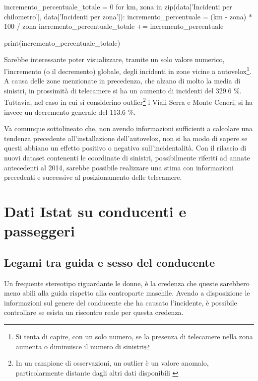 \documentclass[a4paper]{report}
\begin{document}
\begin{code}
incremento_percentuale_totale = 0
for km, zona in zip(data['Incidenti per chilometro'], data['Incidenti per zona']): 
    incremento_percentuale = (km - zona) * 100 / zona
    incremento_percentuale_totale += incremento_percentuale

print(incremento_percentuale_totale)
\end{code}

Sarebbe interessante poter visualizzare, tramite un solo valore numerico, 
l'incremento (o il decremento) globale, degli incidenti in zone vicine a 
autovelox\footnote{Si tenta di capire, con un solo numero, se la presenza di 
telecamere nella zona aumenta o diminuisce il numero di sinistri}. 
A causa delle zone menzionate in precedenza, che alzano di molto la media di sinistri, 
in prossimità di telecamere si ha un aumento di 
incidenti del $329.6$ \%. 
Tuttavia, nel caso in cui si considerino 
outlier\footnote{In un campione di osservazioni, un outlier è un valore anomalo, 
particolarmente distante dagli altri dati disponibili \cite{PROB_E_STATISTICA:1}} 
i Viali Serra e Monte Ceneri, si ha invece un decremento generale del $113.6$ \%. 

Va comunque sottolineato che, non avendo informazioni sufficienti a calcolare una tendenza 
precedente all'installazione dell'autovelox, non si ha modo di sapere se questi abbiano un 
effetto positivo o negativo sull'incidentalità. 
Con il rilascio di nuovi dataset contenenti le coordinate di sinistri, 
possibilmente riferiti ad annate antecedenti al 2014, sarebbe possibile realizzare 
una stima con informazioni precedenti e 
successive al posizionamento delle telecamere. 

\section{Dati Istat su conducenti e passeggeri}

\subsection{Legami tra guida e sesso del conducente}

Un frequente stereotipo riguardante le donne, è la credenza che queste  
sarebbero meno abili alla guida rispetto alla controparte maschile. 
Avendo a disposizione le informazioni sul genere del conducente che ha causato l'incidente, 
è possibile controllare se esista un riscontro reale per questa credenza. 
\end{document}
